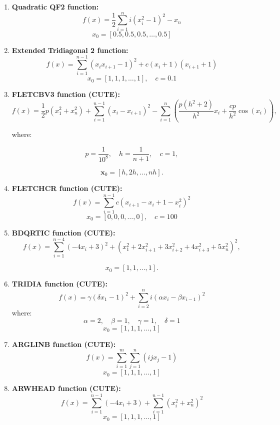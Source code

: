 \documentclass[10pt]{article}
\begin{document}
\begin{enumerate}
    \item \textbf{Quadratic QF2 function:}
    \[
    f(x) =  \frac{1}{2} \sum_{i=1}^{n} i\left( x_i^2 - 1\right)^2 - x_n
    \]
    \[
    x_0 = [0.5, 0.5, 0.5, \dots, 0.5]
    \]

    \item \textbf{Extended Tridiagonal 2 function:}
    \[
    f(x) = \sum_{i=1}^{n-1}(x_ix_{i+1} - 1)^2 + c(x_i + 1)(x_{i+1} + 1)
    \]
    \[
    x_0 = [1, 1, 1, \dots, 1], \quad c = 0.1
    \]

    \item \textbf{FLETCBV3 function (CUTE):}
    \[
    f(x) = \frac{1}{2}p(x_1^2 + x_n^2) + \sum_{i=1}^{n-1} (x_i - x_{i+1})^2 - \sum_{i=1}^{n} \left( \frac{p(h^2 + 2)}{h^2} x_i + \frac{c p}{h^2} \cos(x_i) \right),
    \]

    where:

    \[
    p = \frac{1}{10^8}, \quad h = \frac{1}{n + 1}, \quad c = 1,
    \]

    \[
    \mathbf{x}_0 = [h, 2h, \ldots, n h].
    \]

    \item \textbf{FLETCHCR function (CUTE):}
    \[
    f(x) = \sum_{i=1}^{n-1}  c (x_{i+1} - x_i + 1 - x_i^2)^2 
    \]
    \[
    x_0 = [0, 0, 0, \dots, 0], \quad c = 100
    \]

    \item \textbf{BDQRTIC function (CUTE):}
    \[
    f(x) = \sum_{i=1}^{n-4} (-4 x_i + 3)^2 + \left( x_1^2 + 2 x_{i+1}^2 + 3 x_{i+2}^2 + 4 x_{i+3}^2 + 5 x_n^2 \right)^2,
    \]

    \[
    x_0 = [1, 1, \ldots, 1].
    \]


    \item \textbf{TRIDIA function (CUTE):}
    \[
    f(x) = \gamma(\delta x_1 - 1)^2 + \sum_{i=2}^{n} i \left( \alpha x_i - \beta x_{i-1}\right)^2 
    \]
    where:
    \[
        \alpha = 2, \quad \beta = 1, \quad \gamma = 1, \quad \delta = 1
    \]
    \[
    x_0 = [1, 1, 1, \dots, 1]
    \]

    \item \textbf{ARGLINB function (CUTE):}
    \[
    f(x) = \sum_{i=1}^{m} \sum_{j=1}^{n} \left( ij x_j  - 1\right)
    \]
    \[
    x_0 = [1, 1, 1, \dots, 1]
    \]

    \item \textbf{ARWHEAD function (CUTE):}
    \[
    f(x) = \sum_{i=1}^{n-1} \left( -4x_i + 3 \right) + \sum_{i=1}^{n-1} \left(x_i^2 + x_n^2\right)^2
    \]
    \[
    x_0 = [1, 1, 1, \dots, 1]
    \]


\end{enumerate}
\end{document}
